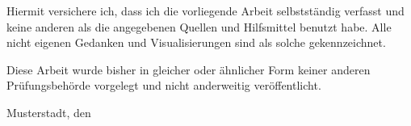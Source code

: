 Hiermit versichere ich, dass ich die vorliegende Arbeit selbstständig verfasst
und keine anderen als die angegebenen Quellen und Hilfsmittel benutzt habe.
Alle nicht eigenen Gedanken und Visualisierungen sind als solche gekennzeichnet.

Diese Arbeit wurde bisher in gleicher oder ähnlicher Form keiner anderen Prüfungsbehörde vorgelegt und nicht anderweitig veröffentlicht.

\vspace{\baselineskip}

Musterstadt, den \abgabedat
\vspace{.2in}
\par\noindent\makebox[2.5in]{\hrulefill}
\vspace{-.6\baselineskip}
\par\noindent\makebox[2.5in][l]{{\small\student\par}}